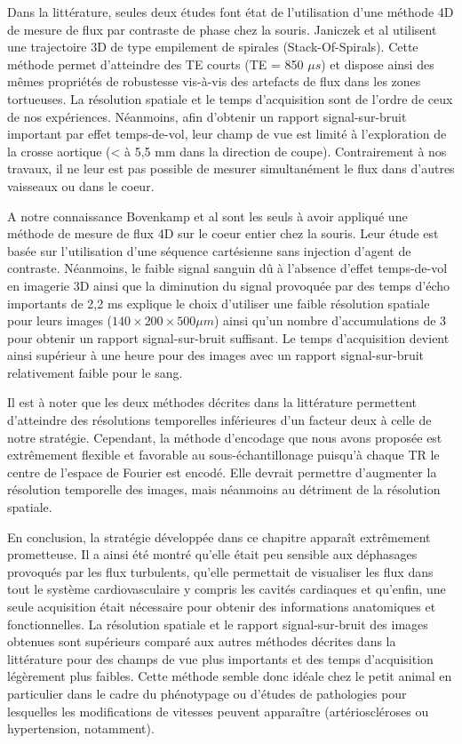 Dans la littérature, seules deux études font état de l'utilisation d'une méthode 4D de mesure de flux par contraste de phase chez la souris. Janiczek et al \cite{Janiczek:2011qm} utilisent une trajectoire 3D de type empilement de spirales (Stack-Of-Spirals). Cette méthode permet d'atteindre des TE courts (TE = 850 $\mu s$) et dispose ainsi des mêmes propriétés de robustesse vis-à-vis des artefacts de flux dans les zones tortueuses. La résolution spatiale et le temps d'acquisition sont de l'ordre de ceux de nos expériences. Néanmoins, afin d’obtenir un rapport signal-sur-bruit important par effet temps-de-vol, leur champ de vue est limité à l’exploration de la crosse aortique (< à 5,5 mm dans la direction de coupe). Contrairement à nos travaux, il ne leur est pas possible de mesurer simultanément le flux dans d’autres vaisseaux ou dans le coeur.

A notre connaissance Bovenkamp et al \cite{bovenkamp2014velocity} sont les seuls à avoir appliqué une méthode de mesure de flux 4D sur le coeur entier chez la souris. Leur étude est basée sur l'utilisation d'une séquence cartésienne sans injection d'agent de contraste.
Néanmoins, le faible signal sanguin dû à l'absence d'effet temps-de-vol en imagerie 3D ainsi que la diminution du signal  provoquée par des temps d'écho importants de 2,2 ms explique le choix d'utiliser une faible résolution spatiale pour leurs images ($140 \times 200 \times 500 \mu m$) ainsi qu'un nombre d'accumulations de 3 pour obtenir un rapport signal-sur-bruit suffisant. Le temps d’acquisition devient ainsi supérieur à une heure pour des images avec un rapport signal-sur-bruit relativement faible pour le sang.

Il est à noter que les deux méthodes décrites dans la littérature permettent d'atteindre des résolutions temporelles inférieures d'un facteur deux à celle de notre stratégie. Cependant, la méthode d’encodage que nous avons proposée est extrêmement flexible et favorable au sous-échantillonage puisqu’à chaque TR le centre de l’espace de Fourier est encodé. Elle devrait permettre d’augmenter la résolution temporelle des images, mais néanmoins au détriment de la résolution spatiale.

En conclusion, la stratégie développée dans ce chapitre apparaît extrêmement prometteuse. Il a ainsi été montré qu’elle était peu sensible aux déphasages provoqués par les flux turbulents, qu’elle permettait de visualiser les flux dans tout le système cardiovasculaire y compris les cavités cardiaques et qu’enfin, une seule acquisition était nécessaire pour obtenir des informations anatomiques et fonctionnelles.
La résolution spatiale et le rapport signal-sur-bruit des images obtenues sont supérieurs comparé aux autres méthodes décrites dans la littérature pour des champs de vue plus importants et des temps d’acquisition légèrement plus faibles. Cette méthode semble donc idéale chez le petit animal en particulier dans le cadre du phénotypage ou d’études de pathologies pour lesquelles les modifications de vitesses peuvent apparaître (artérioscléroses ou hypertension, notamment).

